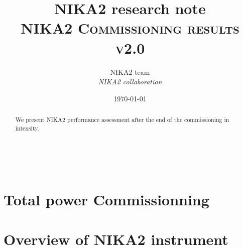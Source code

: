 \documentclass[a4paper, 11pt]{article} %
\title{\textbf{NIKA2 research note}\\   
\textsc{NIKA2 Commissioning results v2.0}} %
\author{NIKA2 team %
\\{\textit{NIKA2 collaboration}}} %
\date{\today} %
\makeatletter
\renewcommand{\maketitle}{ %
\begin{flushleft} %
{\LARGE\@title} %

\vspace{50pt} %

{\large\@author} %
\\\@date %

\vspace{40pt} %
\end{flushleft}
}
\makeatother
\begin{document}
\maketitle %
%
%
%
\tableofcontents
\listoffigures
\listoftables


\newpage
\begin{abstract}
We present NIKA2 performance assessment after the end of the commissioning in intensity.
\end{abstract}



\newpage
%
%



\section{Total power Commissionning}
\label{se:intro}



\clearpage
\section{Overview of NIKA2 instrument}
\label{se:bandpasses}


\clearpage
\end{document}
